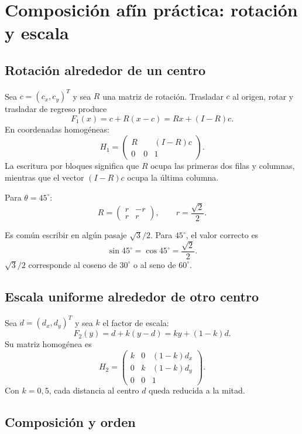 \section{Composición afín práctica: rotación y escala}\label{cap:composicion-afin}\label{ap:composicion-afin}

\subsection{Rotación alrededor de un centro}

Sea \(c=(c_x,c_y)^T\) y sea \(R\) una matriz de rotación. Trasladar \(c\) al origen, rotar
y trasladar de regreso produce
\[
F_1(x)=c+R(x-c)=Rx+(I-R)c.
\]
En coordenadas homogéneas:
\[
\boxed{
H_1=
\left(
\begin{array}{c|c}
R&(I-R)c\\ \hline
0\quad0&1
\end{array}
\right)
}.
\]
La escritura por bloques significa que \(R\) ocupa las primeras dos filas y columnas, mientras
que el vector \((I-R)c\) ocupa la última columna.

Para \(\theta=45^\circ\):
\[
R=
\begin{pmatrix}
r&-r\\
r&r
\end{pmatrix},
\qquad
r=\frac{\sqrt2}{2}.
\]

\begin{atencion}
Es común escribir en algún pasaje \(\sqrt3/2\). Para \(45^\circ\), el valor correcto es
\[
\sin45^\circ=\cos45^\circ=\frac{\sqrt2}{2}.
\]
\(\sqrt3/2\) corresponde al coseno de \(30^\circ\) o al seno de \(60^\circ\).
\end{atencion}

\subsection{Escala uniforme alrededor de otro centro}

Sea \(d=(d_x,d_y)^T\) y sea \(k\) el factor de escala:
\[
F_2(y)=d+k(y-d)=ky+(1-k)d.
\]
Su matriz homogénea es
\[
\boxed{
H_2=
\begin{pmatrix}
k&0&(1-k)d_x\\
0&k&(1-k)d_y\\
0&0&1
\end{pmatrix}
}.
\]
Con \(k=0{,}5\), cada distancia al centro \(d\) queda reducida a la mitad.

\subsection{Composición y orden}

